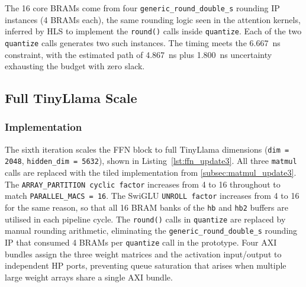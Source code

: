 The 16 core BRAMs come from four \texttt{generic\_round\_double\_s}
rounding IP instances (4 BRAMs each), the same rounding logic seen in the
attention kernels, inferred by HLS to implement the \texttt{round()} calls
inside \texttt{quantize}. Each of the two \texttt{quantize} calls generates
two such instances. The timing meets the \SI{6.667}{\nano\second}
constraint, with the estimated path of \SI{4.867}{\nano\second} plus
\SI{1.800}{\nano\second} uncertainty exhausting the budget with zero
slack.

\subsection{Full TinyLlama Scale}
\label{subsec:ffn_update3}

\subsubsection{Implementation}
\label{subsubsec:ffn_update3_impl}

The sixth iteration scales the FFN block to full TinyLlama dimensions
(\texttt{dim\,=\,2048}, \texttt{hidden\_dim\,=\,5632}), shown in
Listing~\ref{lst:ffn_update3}. All three \texttt{matmul} calls are
replaced with the tiled implementation from \cref{subsec:matmul_update3}.
The \texttt{ARRAY\_PARTITION cyclic factor} increases from 4 to 16
throughout to match \texttt{PARALLEL\_MACS\,=\,16}. The SwiGLU
\texttt{UNROLL factor} increases from 4 to 16 for the same reason, so
that all 16 BRAM banks of the \texttt{hb} and \texttt{hb2} buffers are
utilised in each pipeline cycle. The \texttt{round()} calls in
\texttt{quantize} are replaced by manual rounding arithmetic, eliminating
the \texttt{generic\_round\_double\_s} rounding IP that consumed 4 BRAMs
per \texttt{quantize} call in the prototype. Four AXI bundles assign the
three weight matrices and the activation input/output to independent HP
ports, preventing queue saturation that arises when multiple large
weight arrays share a single AXI bundle.

